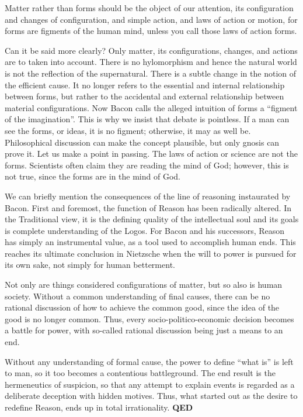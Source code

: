 \begin{quotex}
Matter rather than forms should be the object of our attention, its configuration and changes of configuration, and simple action, and laws of action or motion, for forms are figments of the human mind, unless you call those laws of action forms. 

\end{quotex}
Can it be said more clearly? Only matter, its configurations, changes, and actions are to taken into account. There is no hylomorphism and hence the natural world is not the reflection of the supernatural. There is a subtle change in the notion of the efficient cause. It no longer refers to the essential and internal relationship between forms, but rather to the accidental and external relationship between material configurations. Now Bacon calls the alleged intuition of forms a ``figment of the imagination''. This is why we insist that debate is pointless. If a man can see the forms, or ideas, it is no figment; otherwise, it may as well be. Philosophical discussion can make the concept plausible, but only gnosis can prove it. Let us make a point in passing. The laws of action or science are not the forms. Scientists often claim they are reading the mind of God; however, this is not true, since the forms are in the mind of God.

We can briefly mention the consequences of the line of reasoning instaurated by Bacon. First and foremost, the function of Reason has been radically altered. In the Traditional view, it is the defining quality of the intellectual soul and its goals is complete understanding of the Logos. For Bacon and his successors, Reason has simply an instrumental value, as a tool used to accomplish human ends. This reaches its ultimate conclusion in Nietzsche when the will to power is pursued for its own sake, not simply for human betterment.

Not only are things considered configurations of matter, but so also is human society. Without a common understanding of final causes, there can be no rational discussion of how to achieve the common good, since the idea of the good is no longer common. Thus, every socio-politico-economic decision becomes a battle for power, with so-called rational discussion being just a means to an end.

Without any understanding of formal cause, the power to define “what is” is left to man, so it too becomes a contentious battleground. The end result is the hermeneutics of suspicion, so that any attempt to explain events is regarded as a deliberate deception with hidden motives. Thus, what started out as the desire to redefine Reason, ends up in total irrationality. \textbf{QED}



